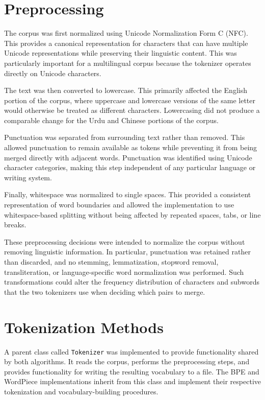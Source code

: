 \documentclass[sigconf]{acmart}
\begin{document}
\section{Preprocessing}

The corpus was first normalized using Unicode Normalization Form C
(NFC). This provides a canonical representation for characters that can
have multiple Unicode representations while preserving their linguistic
content. This was particularly important for a multilingual corpus
because the tokenizer operates directly on Unicode characters.

The text was then converted to lowercase. This primarily affected the
English portion of the corpus, where uppercase and lowercase versions
of the same letter would otherwise be treated as different characters.
Lowercasing did not produce a comparable change for the Urdu and
Chinese portions of the corpus.

Punctuation was separated from surrounding text rather than removed.
This allowed punctuation to remain available as tokens while preventing
it from being merged directly with adjacent words. Punctuation was
identified using Unicode character categories, making this step
independent of any particular language or writing system.

Finally, whitespace was normalized to single spaces. This provided a
consistent representation of word boundaries and allowed the
implementation to use whitespace-based splitting without being affected
by repeated spaces, tabs, or line breaks.

These preprocessing decisions were intended to normalize the corpus
without removing linguistic information. In particular, punctuation was
retained rather than discarded, and no stemming, lemmatization,
stopword removal, transliteration, or language-specific word
normalization was performed. Such transformations could alter the
frequency distribution of characters and subwords that the two
tokenizers use when deciding which pairs to merge.

\section{Tokenization Methods}

A parent class called \texttt{Tokenizer} was implemented to provide
functionality shared by both algorithms. It reads the corpus, performs
the preprocessing steps, and provides functionality for writing the
resulting vocabulary to a file. The BPE and WordPiece implementations
inherit from this class and implement their respective tokenization and
vocabulary-building procedures.
\end{document}
